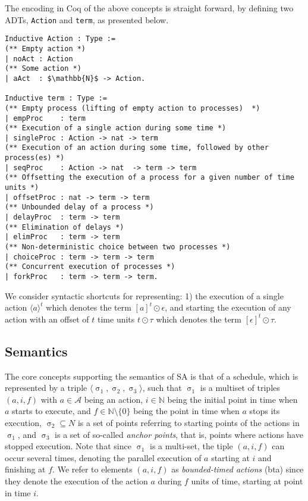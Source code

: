 \documentclass{article}
\begin{document}
The encoding in Coq of the above concepts is straight forward, by defining two ADTs, \verb!Action! and \verb!term!, as presented below. 
\begin{lstlisting}[language={Coq}]
Inductive Action : Type :=
(** Empty action *)
| noAct : Action
(** Some action *)
| aAct  : $\mathbb{N}$ -> Action.

Inductive term : Type :=
(** Empty process (lifting of empty action to processes)  *)
| empProc    : term
(** Execution of a single action during some time *)
| singleProc : Action -> nat -> term
(** Execution of an action during some time, followed by other process(es) *)
| seqProc    : Action -> nat  -> term -> term
(** Offsetting the execution of a process for a given number of time units *)
| offsetProc : nat -> term -> term
(** Unbounded delay of a process *)
| delayProc  : term -> term
(** Elimination of delays *)
| elimProc   : term -> term
(** Non-deterministic choice between two processes *)
| choiceProc : term -> term -> term
(** Concurrent execution of processes *)
| forkProc   : term -> term -> term.
\end{lstlisting}

We consider syntactic shortcuts for representing: 1) the execution of a single action $\langle a \rangle^t$ which denotes the term $[a]^t \odot \epsilon$, and starting the execution of any action with an offset of $t$ time units $t \odot \tau$ which denotes the term $[\epsilon]^t \odot \tau$.

\subsection{Semantics}

The core concepts supporting the semantics of {\sf SA} is that of a schedule, which is represented by a triple $\langle \upsigma_1, \upsigma_2, \upsigma_3 \rangle$, such that $\upsigma_1$ is a multiset of triples $(a,i,f)$ with $a \in \mathcal{A}$ being an action, $i \in \mathbb{N}$ being the initial point in time when $a$ starts to execute, and $f \in \mathbb{N} \setminus \{0\}$ being the point in time when $a$ stops its execution, $\upsigma_2 \subseteq{N}$ is a set of points referring to starting points of the actions in $\upsigma_1$, and $\upsigma_3$ is a set of so-called {\em anchor points}, that is, points where actions have stopped execution. Note that since $\upsigma_1$ is a multi-set, the tiple $(a,i,f)$ can occur several times, denoting the parallel execution of $a$ starting at $i$ and finishing at $f$. We refer to elements $(a,i,f)$ as {\em bounded-timed actions} ({\sc bta}) since they denote the execution of the action $a$ during $f$ units of time, starting at point in time $i$.
\end{document}
